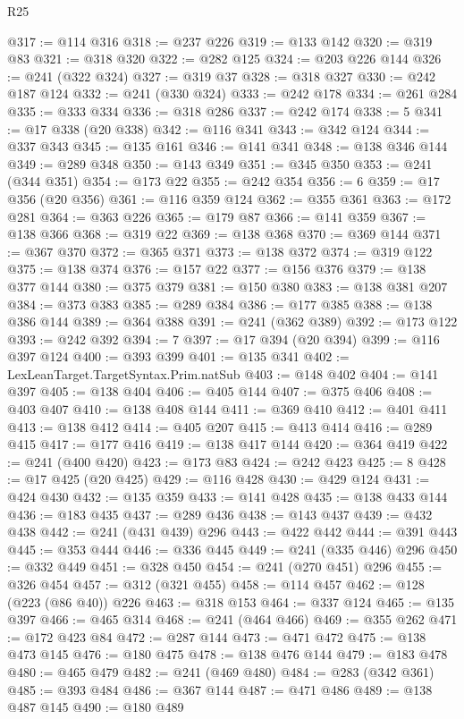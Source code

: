 \begin{lexlean}{R25}
\begin{coremodule}
@317 := @114 @316
@318 := @237 @226
@319 := @133 @142
@320 := @319 @83
@321 := @318 @320
@322 := @282 @125
@324 := @203 @226 @144
@326 := @241 (@322 @324)
@327 := @319 @37
@328 := @318 @327
@330 := @242 @187 @124
@332 := @241 (@330 @324)
@333 := @242 @178
@334 := @261 @284
@335 := @333 @334
@336 := @318 @286
@337 := @242 @174
@338 := 5
@341 := @17 @338 (@20 @338)
@342 := @116 @341
@343 := @342 @124
@344 := @337 @343
@345 := @135 @161
@346 := @141 @341
@348 := @138 @346 @144
@349 := @289 @348
@350 := @143 @349
@351 := @345 @350
@353 := @241 (@344 @351)
@354 := @173 @22
@355 := @242 @354
@356 := 6
@359 := @17 @356 (@20 @356)
@361 := @116 @359 @124
@362 := @355 @361
@363 := @172 @281
@364 := @363 @226
@365 := @179 @87
@366 := @141 @359
@367 := @138 @366
@368 := @319 @22
@369 := @138 @368
@370 := @369 @144
@371 := @367 @370
@372 := @365 @371
@373 := @138 @372
@374 := @319 @122
@375 := @138 @374
@376 := @157 @22
@377 := @156 @376
@379 := @138 @377 @144
@380 := @375 @379
@381 := @150 @380
@383 := @138 @381 @207
@384 := @373 @383
@385 := @289 @384
@386 := @177 @385
@388 := @138 @386 @144
@389 := @364 @388
@391 := @241 (@362 @389)
@392 := @173 @122
@393 := @242 @392
@394 := 7
@397 := @17 @394 (@20 @394)
@399 := @116 @397 @124
@400 := @393 @399
@401 := @135 @341
@402 := LexLeanTarget.TargetSyntax.Prim.natSub
@403 := @148 @402
@404 := @141 @397
@405 := @138 @404
@406 := @405 @144
@407 := @375 @406
@408 := @403 @407
@410 := @138 @408 @144
@411 := @369 @410
@412 := @401 @411
@413 := @138 @412
@414 := @405 @207
@415 := @413 @414
@416 := @289 @415
@417 := @177 @416
@419 := @138 @417 @144
@420 := @364 @419
@422 := @241 (@400 @420)
@423 := @173 @83
@424 := @242 @423
@425 := 8
@428 := @17 @425 (@20 @425)
@429 := @116 @428
@430 := @429 @124
@431 := @424 @430
@432 := @135 @359
@433 := @141 @428
@435 := @138 @433 @144
@436 := @183 @435
@437 := @289 @436
@438 := @143 @437
@439 := @432 @438
@442 := @241 (@431 @439) @296
@443 := @422 @442
@444 := @391 @443
@445 := @353 @444
@446 := @336 @445
@449 := @241 (@335 @446) @296
@450 := @332 @449
@451 := @328 @450
@454 := @241 (@270 @451) @296
@455 := @326 @454
@457 := @312 (@321 @455)
@458 := @114 @457
@462 := @128 (@223 (@86 @40)) @226
@463 := @318 @153
@464 := @337 @124
@465 := @135 @397
@466 := @465 @314
@468 := @241 (@464 @466)
@469 := @355 @262
@471 := @172 @423 @84
@472 := @287 @144
@473 := @471 @472
@475 := @138 @473 @145
@476 := @180 @475
@478 := @138 @476 @144
@479 := @183 @478
@480 := @465 @479
@482 := @241 (@469 @480)
@484 := @283 (@342 @361)
@485 := @393 @484
@486 := @367 @144
@487 := @471 @486
@489 := @138 @487 @145
@490 := @180 @489

\end{coremodule}
\end{lexlean}
